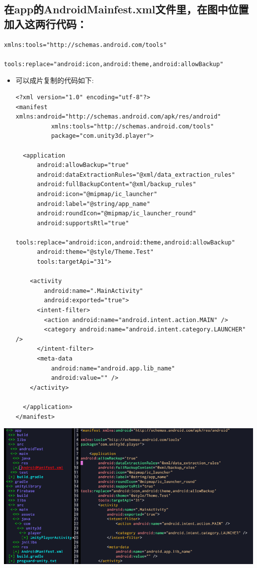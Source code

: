 \documentclass[9pt, b5paper]{article}
\begin{document}
\subsection{在app的AndroidMainfest.xml文件里，在图中位置加入这两行代码：}
\label{sec-5-2}
\begin{verbatim}
xmlns:tools="http://schemas.android.com/tools"

tools:replace="android:icon,android:theme,android:allowBackup"
\end{verbatim}
\begin{itemize}
\item 可以成片复制的代码如下:
\begin{verbatim}
<?xml version="1.0" encoding="utf-8"?>
<manifest xmlns:android="http://schemas.android.com/apk/res/android"
          xmlns:tools="http://schemas.android.com/tools"
          package="com.unity3d.player">

  <application
      android:allowBackup="true"
      android:dataExtractionRules="@xml/data_extraction_rules"
      android:fullBackupContent="@xml/backup_rules"
      android:icon="@mipmap/ic_launcher"
      android:label="@string/app_name"
      android:roundIcon="@mipmap/ic_launcher_round"
      android:supportsRtl="true"
      tools:replace="android:icon,android:theme,android:allowBackup"
      android:theme="@style/Theme.Test"
      tools:targetApi="31">

    <activity
        android:name=".MainActivity"
        android:exported="true">
      <intent-filter>
        <action android:name="android.intent.action.MAIN" />
        <category android:name="android.intent.category.LAUNCHER" />
      </intent-filter>
      <meta-data
          android:name="android.app.lib_name"
          android:value="" />
    </activity>

  </application>
</manifest>
\end{verbatim}
\end{itemize}

\includegraphics[width=.9\linewidth]{./pic/unityToAndroid_20221123_223757.png}
\end{document}
